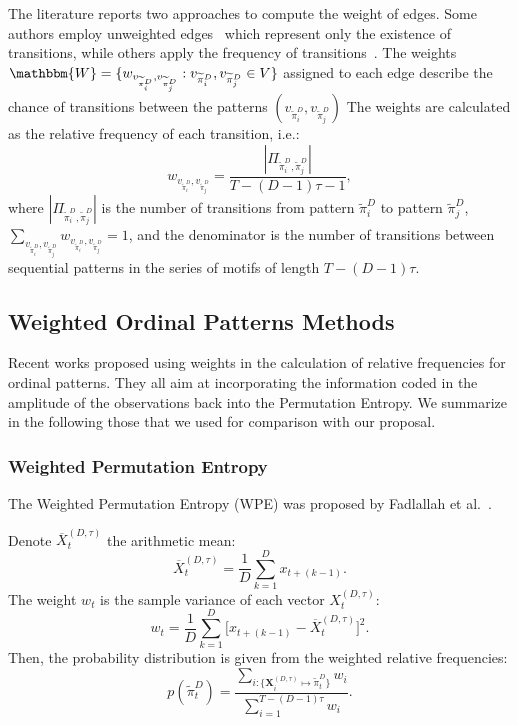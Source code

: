 \documentclass[journal]{IEEEtran}
\begin{document}
The literature reports two approaches to compute the weight of edges.
Some authors employ unweighted edges~\cite{McCullough2015lagged,Kulp2016ordinal} which represent only the existence of transitions, while others apply the frequency of transitions~\cite{Sorrentino2015periodic,Zhang2017ConstructingOP}.
The weights $\mathbbm{W} = \{w_{v_{\widetilde{\pi}^D_i}, v_{\widetilde\pi^D_j}}: v_{\widetilde\pi^D_i}, v_{\widetilde\pi^D_j} \in V \}$ assigned to each edge describe the chance of transitions between the patterns $(v_{\widetilde\pi^D_i}, v_{\widetilde\pi^D_j})$
The weights are calculated as the relative frequency of each transition, i.e.:
\begin{equation}
w_{v_{\widetilde\pi^D_i}, v_{\widetilde\pi^D_j}} = \frac{|\Pi_{\widetilde\pi^D_i,\widetilde\pi^D_j}|}{T-(D-1)\tau-1},
\end{equation}
where $|\Pi_{\widetilde\pi^D_i,\widetilde\pi^D_j}|$ is the number of transitions from pattern $\widetilde\pi^D_i$ to pattern $\widetilde\pi^D_j$, $\sum_{v_{\widetilde\pi^D_i}, v_{\widetilde\pi^D_j}}w_{v_{\widetilde\pi^D_i}, v_{\widetilde\pi^D_j}} = 1$,
and the denominator is the number of transitions between sequential patterns in the series of motifs of length $T-(D-1)\tau$.

\subsection{Weighted Ordinal Patterns Methods}\label{Methods}

Recent works proposed using weights in the calculation of relative frequencies for ordinal patterns.
They all aim at incorporating the information coded in the amplitude of the observations back into the Permutation Entropy.
We summarize in the following those that we used for comparison with our proposal.

\subsubsection{Weighted Permutation Entropy}\label{WPE}

The Weighted Permutation Entropy (WPE) was proposed by Fadlallah et al.~\cite{Fadlallah2013Weightedpermutation}. 

Denote $\overline{X}_t^{(D, \tau)}$ the arithmetic mean:
\begin{equation}
\overline{X}_t^{(D, \tau)} = \frac{1}{D} \sum_{k = 1}^{D} x_{t + (k - 1)}.
\end{equation}
The weight $w_{t}$ is the sample variance of each vector $X_t^{(D, \tau)}$:
\begin{equation}
w_{t} = \frac{1}{D} \sum_{k = 1}^{D}\big[x_{t + (k - 1)} - \overline{X}_t^{(D, \tau)}\big]^2 .
\end{equation}
Then, the probability distribution is given from the weighted relative frequencies:
\begin{equation}
p(\widetilde \pi_t^D) = \frac{\sum_{i : \{\mathbf{X}^{(D,\tau)}_i \mapsto \widetilde\pi^D_t\}} w_{i}}{\sum_{i = 1}^{T-(D-1)\tau} w_{i}}.
\end{equation}
\end{document}

